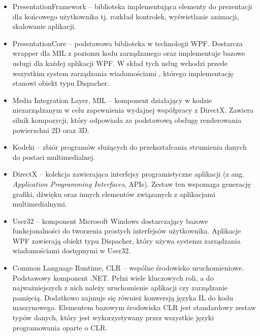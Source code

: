 \begin{itemize}
	\item PresentationFramework – biblioteka implementująca elementy do prezentacji dla końcowego użytkownika tj. rozkład kontrolek, wyświetlanie animacji, skalowanie aplikacji. 
	
	\item PresentationCore – podstawowa biblioteka w technologii WPF. Dostarcza wrapper dla MIL z poziomu kodu zarządzanego oraz implementuje bazowe  usługi dla każdej aplikacji WPF. W skład tych usług wchodzi przede wszystkim system zarządzania wiadomościami , którego implementację stanowi obiekt typu Dispacher.  
	
	\item Media Integration Layer, MIL – komponent działający w kodzie niezarządzanym w celu zapewnienia wydajnej współpracy  z DirectX.   Zawiera silnik kompozycji, który odpowiada za  podstawową obsługę renderowania powierzchni 2D oraz 3D.
	
	\item Kodeki – zbiór programów służących do przekształcania strumienia danych do postaci multimedialnej.
	
	\item DirectX – kolekcja zawierająca interfejsy programistyczne aplikacji (z ang. \textit{Application Programming Interfaces}, APIs). Zestaw ten  wspomaga generację grafiki, dźwięku oraz innych elementów związanych z aplikacjami multimedialnymi.
	
	\item User32 – komponent Microsoft Windows dostarczający bazowe funkcjonalności do tworzenia prostych interfejsów użytkownika.  Aplikacje WPF zawierają obiekt typu Dispacher, który używa systemu zarządzania wiadomościami dostępnymi w User32.
	
	\item Common Language Runtime, CLR – wspólne środowisko uruchomieniowe. Podstawowy komponent .NET. Pełni wiele kluczowych roli, a do najważniejszych z nich należy uruchomienie aplikacji czy zarządzanie pamięcią. Dodatkowo zajmuje się również konwersją języka IL do kodu maszynowego. Elementem bazowym środowiska CLR jest standardowy zestaw typów danych, który jest wykorzystywany przez wszystkie języki programowania oparte o CLR. 
	
\end{itemize}

